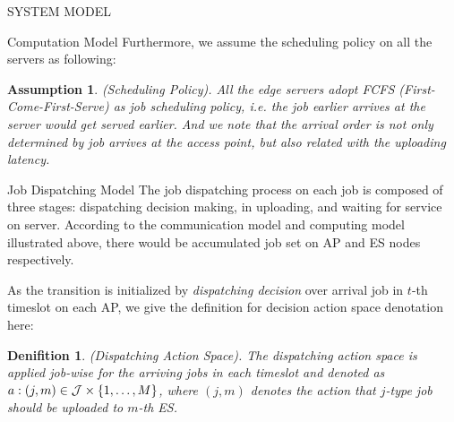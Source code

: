 \documentclass[10pt, conference, letterpaper]{IEEEtran}
\newtheorem{definition}{Denifition}
\newtheorem{assumption}{Assumption}
\DeclarePairedDelimiter{\set}{\{}{\}}
\newcommand{\jSet}{\mathcal{J}}
\begin{document}
\begin{section}{SYSTEM MODEL}
\begin{subsection}{Computation Model}
            Furthermore, we assume the scheduling policy on all the servers as following:
            \begin{assumption}
                (Scheduling Policy).
                All the edge servers adopt \emph{FCFS} (First-Come-First-Serve) as job scheduling policy, i.e. the job earlier arrives at the server would get served earlier. And we note that the arrival order is not only determined by job arrives at the access point, but also related with the uploading latency.
            \end{assumption}
        \end{subsection}

        \begin{subsection}{Job Dispatching Model}
            The job dispatching process on each job is composed of three stages: dispatching decision making, in uploading, and waiting for service on server. According to the communication model and computing model illustrated above, there would be accumulated job set on AP and ES nodes respectively.

            As the transition is initialized by \emph{dispatching decision} over arrival job in $t$-th timeslot on each AP, we give the definition for decision action space denotation here:
            \begin{definition}
                (Dispatching Action Space).
                The dispatching action space is applied job-wise for the arriving jobs in each timeslot and denoted as $a: (j, m) \in \jSet \times \set{1,\dots,M}$, where $(j, m)$ denotes the action that $j$-type job should be uploaded to $m$-th ES.
            \end{definition}


\end{subsection}
\end{section}
\end{document}
